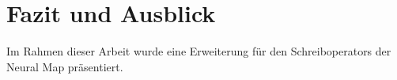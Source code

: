 \chapter{Fazit und Ausblick}

Im Rahmen dieser Arbeit wurde eine Erweiterung für den Schreiboperators der Neural Map präsentiert.
